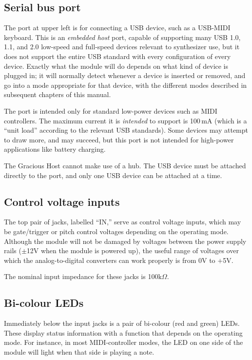 \subsection{Serial bus port}

The port at upper left is for connecting a USB device, such as a USB-MIDI
keyboard.  This is an \emph{embedded host} port, capable of supporting many
USB 1.0, 1.1, and 2.0 low-speed and full-speed devices relevant to
synthesizer use, but it does not support the entire USB standard with every
configuration of every device.  Exactly what the module will do depends on
what kind of device is plugged in; it will normally detect whenever a device
is inserted or removed, and go into a mode appropriate for that device, with
the different modes described in subsequent chapters of this manual.

The port is intended only for standard low-power devices such as MIDI
controllers.  The maximum current it is \emph{intended} to support is
100\,mA (which is a ``unit load'' according to the relevant USB
standards).  Some devices may attempt to draw more, and may succeed, but this
port is not intended for high-power applications like battery charging.

The Gracious Host cannot make use of a hub.  The USB device must be
attached directly to the port, and only one USB device can be attached at a
time.

\subsection{Control voltage inputs}

The top pair of jacks, labelled ``IN,'' serve as control voltage inputs,
which may be gate/trigger or pitch control voltages depending on the
operating mode.  Although the module will not be damaged by voltages between
the power supply rails ($\pm$12V when the module is powered up), the useful
range of voltages over which the analog-to-digital converters can work
properly is from 0V to $+$5V.

The nominal input impedance for these jacks is 100k$\Omega$.

\subsection{Bi-colour LEDs}

Immediately below the input jacks is a pair of bi-colour (red and green)
LEDs.  These display status information with a function that depends on the
operating mode.  For instance, in most MIDI-controller modes, the LED on one
side of the module will light when that side is playing a note.

